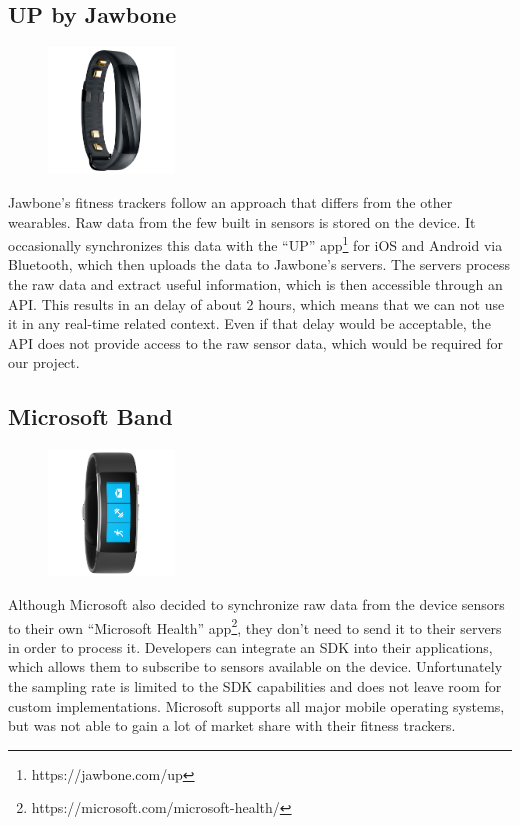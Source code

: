 \subsection{UP by Jawbone}
\begin{figure}
	\begin{center}
		\includegraphics[width=0.3\textwidth]{images/device_up.png}
	\end{center}
\end{figure}
Jawbone's fitness trackers follow an approach that differs from the other wearables.
Raw data from the few built in sensors is stored on the device.
It occasionally synchronizes this data with the ``UP'' app\footnote{https://jawbone.com/up} for iOS and Android via Bluetooth, which then uploads the data to Jawbone's servers.
The servers process the raw data and extract useful information, which is then accessible through an API.
This results in an delay of about 2 hours, which means that we can not use it in any real-time related context.
Even if that delay would be acceptable, the API does not provide access to the raw sensor data, which would be required for our project.

\subsection{Microsoft Band}
\begin{figure}
	\begin{center}
		\includegraphics[width=0.3\textwidth]{images/device_msband.png}
	\end{center}
\end{figure}
Although Microsoft also decided to synchronize raw data from the device sensors to their own ``Microsoft Health'' app\footnote{https://microsoft.com/microsoft-health/}, they don't need to send it to their servers in order to process it.
Developers can integrate an SDK into their applications, which allows them to subscribe to sensors available on the device.
Unfortunately the sampling rate is limited to the SDK capabilities and does not leave room for custom implementations.
Microsoft supports all major mobile operating systems, but was not able to gain a lot of market share with their fitness trackers.

